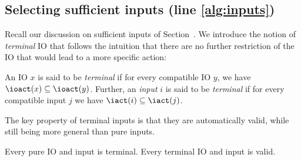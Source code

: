 \documentclass[sigconf,screen,nonacm]{acmart}
\begin{document}
\subsection{Selecting sufficient inputs (line \ref{alg:inputs})}


Recall our discussion on sufficient inputs of Section~\label{sec:rel}.  We
introduce the notion of \emph{terminal} IO that follows the intuition that there
are no further restriction of the IO that would lead to a more specific action:
\begin{definition}
  An IO \(x\) is said to be \emph{terminal} if for every compatible IO \(y\), we
  have \(\ioact(x) \subseteq \ioact(y)\).  Further, an \emph{input} \(i\) is said to be
  \emph{terminal} if for every compatible input \(j\) we have
  \(\iact(i) \subseteq \iact(j)\).
\end{definition}

The key property of terminal inputs is that they are automatically valid, while
still being more general than pure inputs.
\begin{proposition}
  Every pure IO and input is terminal.  Every terminal IO and input is valid.
\end{proposition}


\end{document}
